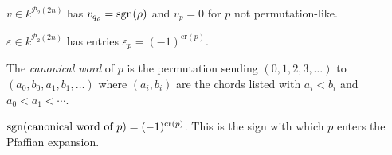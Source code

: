 \begin{definition}\label{def:det_vector}
\leanok
{}
$v\in k^{\mathcal P_2(2n)}$ has $v_{q_\rho} = \operatorname{sgn}(\rho)$ and $v_p = 0$ for
$p$ not permutation-like.
\end{definition}

\begin{definition}\label{def:eps_vector}
\leanok
{}
$\varepsilon\in k^{\mathcal P_2(2n)}$ has entries
$\varepsilon_p = (-1)^{\mathrm{cr}(p)}$.
\end{definition}

\begin{definition}\label{def:canonical_word}
\leanok
{}
The \emph{canonical word} of $p$ is the permutation sending
$(0,1,2,3,\dots)$ to $(a_0,b_0,a_1,b_1,\dots)$ where $(a_i,b_i)$ are the
chords listed with $a_i<b_i$ and $a_0<a_1<\cdots$.
\end{definition}

\begin{lemma}\label{lem:sign_canonical_word}
\leanok
{}
$\operatorname{sgn}(\text{canonical word of }p) = (-1)^{\mathrm{cr}(p)}$. This is the
sign with which $p$ enters the Pfaffian expansion.
\end{lemma}

